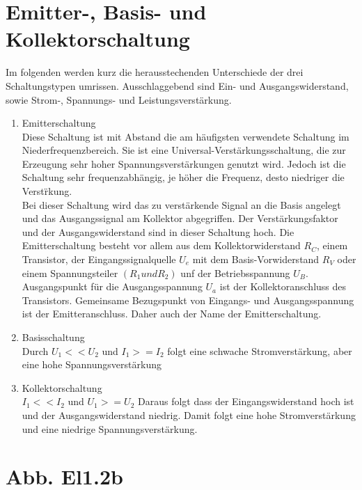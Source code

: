 \section{Emitter-, Basis- und Kollektorschaltung}
Im folgenden werden kurz die herausstechenden Unterschiede der drei Schaltungstypen
umrissen. Ausschlaggebend sind Ein- und Ausgangswiderstand, sowie Strom-, Spannungs- und
Leistungsverstärkung.
\begin{enumerate} 
\item Emitterschaltung\\
Diese Schaltung ist mit Abstand die am häufigsten verwendete Schaltung im
Niederfrequenzbereich. Sie ist eine Universal-Verst\"arkungsschaltung, die zur Erzeugung sehr hoher Spannungsverst\"arkungen genutzt wird. Jedoch ist die Schaltung sehr frequenzabh\"angig, je h\"oher die Frequenz, desto niedriger die Verst\"rkung. \\
Bei dieser Schaltung wird das zu verstärkende Signal an die Basis angelegt
und das Ausgangssignal am Kollektor abgegriffen. Der Verstärkungsfaktor und der
Ausgangswiderstand sind in dieser Schaltung hoch. Die Emitterschaltung besteht vor allem aus dem Kollektorwiderstand $R_C$, einem Transistor, der Eingangssignalquelle $U_e$ mit dem Basis-Vorwiderstand $R_V$ oder einem Spannungsteiler $(R_1 und R_2)$ unf der Betriebsspannung $U_B$. Ausgangspunkt f\"ur die Ausgangsspannung $U_a$ ist der Kollektoranschluss des Transistors. Gemeinsame Bezugspunkt von Eingangs- und Ausgangsspannung ist der Emitteranschluss. Daher auch der Name der Emitterschaltung. 
\item Basisschaltung\\
Durch $U_1<<U_2$ und $I_1>=I_2$ folgt eine schwache Stromverstärkung, aber eine hohe
Spannungsverstärkung
\item Kollektorschaltung\\
$I_1<<I_2$ und $U_1>=U_2$ Daraus folgt dass der Eingangswiderstand hoch ist und der
Ausgangswiderstand niedrig. Damit folgt eine hohe Stromverstärkung und eine niedrige
Spannungsverstärkung.
\end{enumerate}
\section{Abb. El1.2b}

